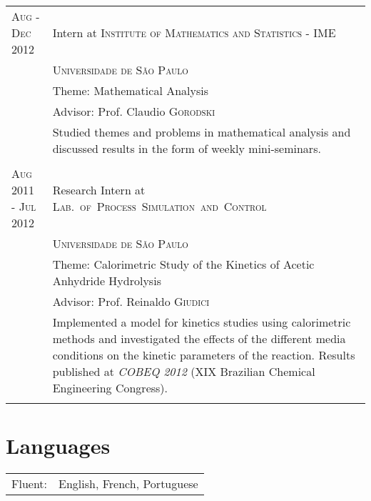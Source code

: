 \documentclass[a4paper,10pt]{article}
\begin{document}
{\begin{tabular}{R{3.5cm} p{10cm}}
\textsc{Aug - Dec 2012} & Intern at \textsc{Institute of Mathematics and Statistics - IME} \\& \textsc{Universidade de
São Paulo}\\ & Theme: Mathematical Analysis \\&  \small Advisor: Prof. Claudio \textsc{Gorodski}\\&
\footnotesize{Studied themes and problems in mathematical analysis and discussed results in the form of weekly
mini-seminars.}\\  \\


\textsc{Aug 2011 - Jul 2012} & Research Intern at \textsc{\mbox{Lab. of Process Simulation and Control}} \\&
\textsc{Universidade de São Paulo}\\ & Theme: Calorimetric Study of the Kinetics of Acetic Anhydride Hydrolysis  \\&
\small Advisor: Prof. Reinaldo \textsc{Giudici}\\& \footnotesize{Implemented a model for kinetics studies using
calorimetric methods and investigated the effects of the different media conditions on the kinetic parameters of the
reaction. Results published at \textit{COBEQ 2012} (XIX Brazilian Chemical Engineering Congress).} \\
 \\
\end{tabular}




\section{Languages}

\vspace*{3pt}
\hspace*{-12pt}
\begin{tabular}{R{3.5cm} p{10cm}}
Fluent: & English, French, Portuguese\\


\end{tabular}}
\end{document}
